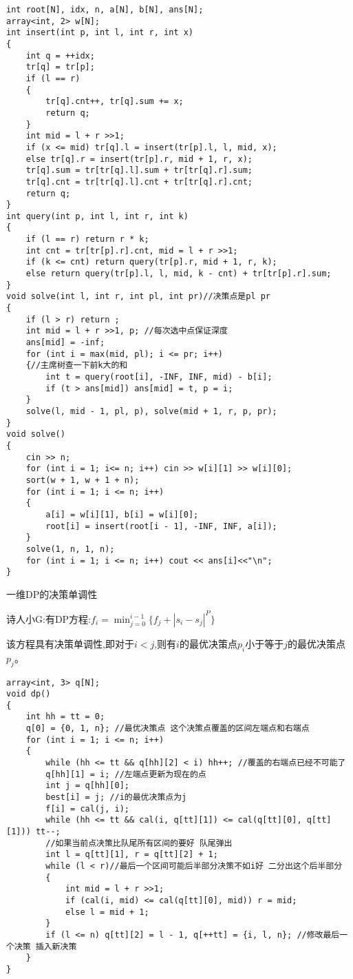 \documentclass[a4paper, fontset=none]{ctexart}
\begin{document}
\begin{verbatim}
int root[N], idx, n, a[N], b[N], ans[N];
array<int, 2> w[N];
int insert(int p, int l, int r, int x)
{
    int q = ++idx;
    tr[q] = tr[p];
    if (l == r)
    {
        tr[q].cnt++, tr[q].sum += x;
        return q;
    }
    int mid = l + r >>1;
    if (x <= mid) tr[q].l = insert(tr[p].l, l, mid, x);
    else tr[q].r = insert(tr[p].r, mid + 1, r, x);
    tr[q].sum = tr[tr[q].l].sum + tr[tr[q].r].sum;
    tr[q].cnt = tr[tr[q].l].cnt + tr[tr[q].r].cnt;
    return q;
}
int query(int p, int l, int r, int k)
{
    if (l == r) return r * k;
    int cnt = tr[tr[p].r].cnt, mid = l + r >>1;
    if (k <= cnt) return query(tr[p].r, mid + 1, r, k);
    else return query(tr[p].l, l, mid, k - cnt) + tr[tr[p].r].sum;
}
void solve(int l, int r, int pl, int pr)//决策点是pl pr
{
    if (l > r) return ;
    int mid = l + r >>1, p; //每次选中点保证深度
    ans[mid] = -inf;
    for (int i = max(mid, pl); i <= pr; i++)
    {//主席树查一下前k大的和
        int t = query(root[i], -INF, INF, mid) - b[i];
        if (t > ans[mid]) ans[mid] = t, p = i;
    }
    solve(l, mid - 1, pl, p), solve(mid + 1, r, p, pr);
}
void solve()
{
    cin >> n;
    for (int i = 1; i<= n; i++) cin >> w[i][1] >> w[i][0];
    sort(w + 1, w + 1 + n);
    for (int i = 1; i <= n; i++)
    {
        a[i] = w[i][1], b[i] = w[i][0];
        root[i] = insert(root[i - 1], -INF, INF, a[i]);
    }
    solve(1, n, 1, n);
    for (int i = 1; i <= n; i++) cout << ans[i]<<"\n";
}
\end{verbatim}

一维DP的决策单调性

诗人小G:有DP方程:$f_i=\min_{j=0}^{i-1}\{f_j+|s_i-s_j|^P\}$

该方程具有决策单调性,即对于$i < j$,则有$i$的最优决策点$p_i$小于等于$j$的最优决策点$p_j$。

\begin{verbatim}
array<int, 3> q[N];
void dp()
{
    int hh = tt = 0;
    q[0] = {0, 1, n}; //最优决策点 这个决策点覆盖的区间左端点和右端点
    for (int i = 1; i <= n; i++)
    {
        while (hh <= tt && q[hh][2] < i) hh++; //覆盖的右端点已经不可能了
        q[hh][1] = i; //左端点更新为现在的点
        int j = q[hh][0];
        best[i] = j; //i的最优决策点为j
        f[i] = cal(j, i);
        while (hh <= tt && cal(i, q[tt][1]) <= cal(q[tt][0], q[tt][1])) tt--;
        //如果当前点决策比队尾所有区间的要好 队尾弹出
        int l = q[tt][1], r = q[tt][2] + 1;
        while (l < r)//最后一个区间可能后半部分决策不如i好 二分出这个后半部分
        {
            int mid = l + r >>1;
            if (cal(i, mid) <= cal(q[tt][0], mid)) r = mid;
            else l = mid + 1;
        }
        if (l <= n) q[tt][2] = l - 1, q[++tt] = {i, l, n}; //修改最后一个决策 插入新决策
    }
}
\end{verbatim}
\end{document}
